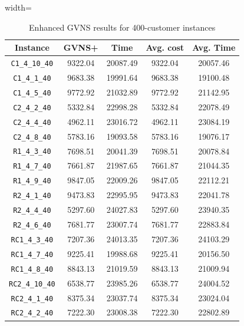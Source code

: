 \documentclass{article}
\begin{document}
\begin{table}[ht]
\centering
\small
\setlength{\tabcolsep}{4pt}
\caption{Enhanced GVNS results for 400-customer instances}
\vspace{4mm}
\begin{adjustbox}{width=\textwidth}
\begin{tabular}{c c c c c}
\toprule
Instance & GVNS+ & Time & Avg. cost & Avg. Time \\
\midrule
\texttt{C1\_4\_10\_40} & 9322.04 & 20087.49 & 9322.04 & 20057.46 \\
\texttt{C1\_4\_1\_40} & 9683.38 & 19991.64 & 9683.38 & 19100.48 \\
\texttt{C1\_4\_5\_40} & 9772.92 & 21032.89 & 9772.92 & 21142.95 \\
\texttt{C2\_4\_2\_40} & 5332.84 & 22998.28 & 5332.84 & 22078.49 \\
\texttt{C2\_4\_4\_40} & 4962.11 & 23016.72 & 4962.11 & 23084.19 \\
\texttt{C2\_4\_8\_40} & 5783.16 & 19093.58 & 5783.16 & 19076.17 \\
\texttt{R1\_4\_3\_40} & 7698.51 & 20041.39 & 7698.51 & 20078.84 \\
\texttt{R1\_4\_7\_40} & 7661.87 & 21987.65 & 7661.87 & 21044.35 \\
\texttt{R1\_4\_9\_40} & 9847.05 & 22009.26 & 9847.05 & 22112.21 \\
\texttt{R2\_4\_1\_40} & 9473.83 & 22995.95 & 9473.83 & 22041.78 \\
\texttt{R2\_4\_4\_40} & 5297.60 & 24027.83 & 5297.60 & 23940.35 \\
\texttt{R2\_4\_6\_40} & 7681.77 & 23007.74 & 7681.77 & 22883.84 \\
\texttt{RC1\_4\_3\_40} & 7207.36 & 24013.35 & 7207.36 & 24103.29 \\
\texttt{RC1\_4\_7\_40} & 9225.41 & 19988.68 & 9225.41 & 20156.50 \\
\texttt{RC1\_4\_8\_40} & 8843.13 & 21019.59 & 8843.13 & 21009.94 \\
\texttt{RC2\_4\_10\_40} & 6538.77 & 23985.26 & 6538.77 & 24004.52 \\
\texttt{RC2\_4\_1\_40} & 8375.34 & 23037.74 & 8375.34 & 23024.04 \\
\texttt{RC2\_4\_2\_40} & 7222.30 & 23008.38 & 7222.30 & 22802.89 \\
\bottomrule
\end{tabular}
\end{adjustbox}
\end{table}
\end{document}
